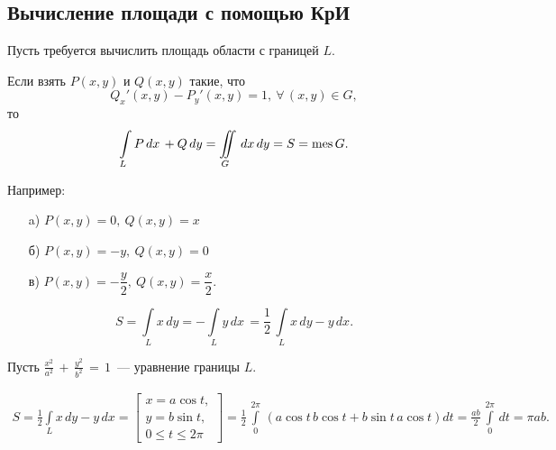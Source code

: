 \documentclass[../../main.tex]{subfiles}
\begin{document}
\subsection{Вычисление площади с помощью КрИ}

Пусть требуется вычислить площадь области с границей $L$. 

Если взять $P(x, y)$ и $Q(x, y)$ такие, что
\[
Q_x'(x, y) - P_y'(x, y) = 1,\ \forall\, (x, y) \in G,
\]
то
\[
\int\limits_{L} P\, dx\, + Q\, dy = \iint\limits_{G}\, dx\, dy
= S = \operatorname{mes} G.
\]

Например:
	\begin{itemize}
		\item[a)] $ P(x, y) = 0,\ Q(x, y) = x $
		\item[б)] $ P(x, y) = -y,\ Q(x, y) = 0 $
		\item[в)] $ P(x, y) = -\dfrac{y}{2},\ Q(x, y) = \dfrac{x}{2}.$
	\end{itemize}

\[
S = \int\limits_{L} x\, dy =
- \int\limits_{L} y\, dx\, =
\frac{1}{2}\, \int\limits_{L} x\, dy - y\, dx.
\]

\begin{example}
	Пусть $\displaystyle
	\frac{x^2}{a^2}\, +\, \frac{y^2}{b^2}\, =\, 1$~--- уравнение границы $L$.
	
	\[
	\begin{gathered}
		S = \frac{1}{2}\int\limits_{L} x\, dy - y\, dx = 
		\left[
			\begin{gathered}
				x = a \cos t, \\
				y = b \sin t, \\
				0 \leq t \leq 2\pi
			\end{gathered}
		\right] =
		\frac{1}{2}\, \int\limits_{0}^{2\pi}\, \left( a \cos t\, b \cos t +
		b \sin t\, a \cos t \right) dt 
		= \frac{ab}{2}\, \int\limits_{0}^{2\pi}\, dt =
		\pi ab.
	\end{gathered}
	\]
\end{example}
\end{document}

